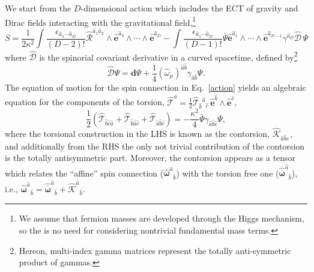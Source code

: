 \documentclass{ws-mpla}
\newcommand{\cdf}[1][]{{\boldsymbol{\mathcal{D}}}{#1}}
\newcommand{\df}[1][]{\mathbf{d}{#1}}
\newcommand{\ga}{\gamma}
\newcommand{\tor}{\mathcal{T}}
\newcommand{\we}{{\scriptstyle\wedge}}
\newcommand{\Bps}{\ensuremath{\bar{\Psi}}}
\newcommand\VIF[1]{\hat{\boldsymbol{e}}^{\hat{#1}}}
\newcommand\hvif[1]{\hat{\boldsymbol{e}}^{{#1}}}
\newcommand\SPIF[2]{\hat{\boldsymbol{\omega}}^{\hat{#1}}{}_{\hat{#2}}}
\newcommand\hspi[1]{\hat{\omega}_{{#1}}}
\newcommand{\hRif}[2]{\hat{\boldsymbol{\mathcal{R}}}^{{#1}}{}_{{#2}}}
\newcommand{\TF}[1]{\hat{\boldsymbol{\mathcal{T}}}^{\hat{#1}}}
\newcommand{\hcont}[3]{\hat{\mathcal{K}}_{#1}{}^{#2}{}_{#3}}
\newcommand{\CONTF}[2]{\hat{\boldsymbol{\mathcal{K}}}^{\hat{#1}}{}_{\hat{#2}}}
\renewcommand{\(}{\left(}
\renewcommand{\)}{\right)}
\renewcommand{\[}{\left[}
\renewcommand{\]}{\right]}
\begin{document}
We start from the $D$-dimensional action which includes the ECT of gravity and Dirac fields interacting with the gravitational field,\footnote{We assume that fermion masses are developed through the Higgs mechanism, so the is no need for considering nontrivial fundamental mass terms.}
\begin{equation}
  S = \frac{1}{2\kappa^2}\int\frac{\epsilon_{\hat{a}_1\cdots \hat{a}_D}}{(D-2)!}\hRif{\hat{a}_1 \hat{a}_2}{} \we \hvif{\hat{a}_3} \we \cdots \we \hvif{\hat{a}_D} - \int \frac{\epsilon_{\hat{a}_1\cdots \hat{a}_D}}{(D-1)!} \Bps \hvif{\hat{a}_1} \we \cdots \we \hvif{\hat{a}_{D-1}}\ga^{\hat{a}_D} \hat{\cdf} \, \Psi
  \label{action}
\end{equation}
where $\hat{\cdf}$ is the spinorial covariant derivative in a curved spacetime, defined by\footnote{Hereon, multi-index gamma matrices represent the totally anti-symmetric product of gammas.}
\begin{equation*}
  \hat{\cdf} \Psi = \df[\Psi] + \frac{1}{4} (\hspi{\mu})^{\hat{a} \hat{b}} \ga_{\hat{a} \hat{b}} \Psi.
\end{equation*}
The equation of motion for the spin connection in Eq.~\eqref{action} yields an algebraic equation for the components of the torsion, $\TF{a} = \tfrac{1}{2} \hat{\tor}{}_{\hat{b}}{}^{\hat{a}}{}_{\hat{c}} \, \VIF{b} \we \VIF{c}$, 
\begin{equation}
  \frac{1}{2}\(\hat{\tor}_{\hat{b} \hat{c} \hat{a} } + \hat{\tor}_{\hat{b} \hat{a} \hat{c} } + \hat{\tor}_{\hat{a} \hat{b} \hat{c} }\) = -\frac{\kappa^2}{4} \bar{\Psi}\ga_{\hat{a} \hat{b} \hat{c}}\Psi,
  \label{tor-eom}
\end{equation}
where the torsional construction in the LHS is known as the contorsion, $\hcont{\hat{a} \hat{b} \hat{c} }{}{}$, and additionally from the RHS the only not trivial contribution of the contorsion is the totally antisymmetric part. Moreover, the contorsion appears as a tensor which relates the ``affine'' spin connection ($\SPIF{a}{b}$) with the torsion free one ($\hat{\overline{\boldsymbol{\omega}}}^{\hat{a}}{}_{\hat{b}}$), i.e., \mbox{$\SPIF{a}{b} = \hat{\overline{\boldsymbol{\omega}}}^{\hat{a}}{}_{\hat{b}}+\CONTF{a}{b}.$}  %
\end{document}
